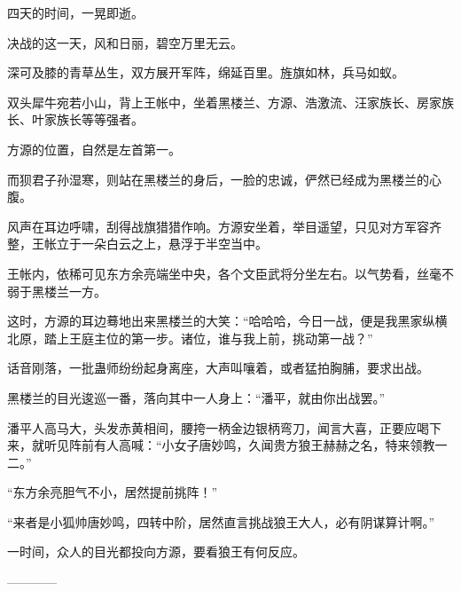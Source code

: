 \begin{this_body}
四天的时间，一晃即逝。

决战的这一天，风和日丽，碧空万里无云。

深可及膝的青草丛生，双方展开军阵，绵延百里。旌旗如林，兵马如蚁。

双头犀牛宛若小山，背上王帐中，坐着黑楼兰、方源、浩激流、汪家族长、房家族长、叶家族长等等强者。

方源的位置，自然是左首第一。

而狈君子孙湿寒，则站在黑楼兰的身后，一脸的忠诚，俨然已经成为黑楼兰的心腹。

风声在耳边呼啸，刮得战旗猎猎作响。方源安坐着，举目遥望，只见对方军容齐整，王帐立于一朵白云之上，悬浮于半空当中。

王帐内，依稀可见东方余亮端坐中央，各个文臣武将分坐左右。以气势看，丝毫不弱于黑楼兰一方。

这时，方源的耳边蓦地出来黑楼兰的大笑：“哈哈哈，今日一战，便是我黑家纵横北原，踏上王庭主位的第一步。诸位，谁与我上前，挑动第一战？”

话音刚落，一批蛊师纷纷起身离座，大声叫嚷着，或者猛拍胸脯，要求出战。

黑楼兰的目光逡巡一番，落向其中一人身上：“潘平，就由你出战罢。”

潘平人高马大，头发赤黄相间，腰挎一柄金边银柄弯刀，闻言大喜，正要应喝下来，就听见阵前有人高喊：“小女子唐妙鸣，久闻贵方狼王赫赫之名，特来领教一二。”

“东方余亮胆气不小，居然提前挑阵！”

“来者是小狐帅唐妙鸣，四转中阶，居然直言挑战狼王大人，必有阴谋算计啊。”

一时间，众人的目光都投向方源，要看狼王有何反应。

------------

\end{this_body}

